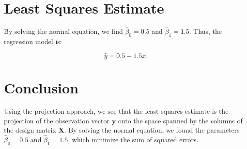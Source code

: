 \section{Least Squares Estimate}

By solving the normal equation, we find $\hat{\beta}_0 = 0.5$ and $\hat{\beta}_1 = 1.5$. Thus, the regression model is:

\begin{equation}
    \hat{y} = 0.5 + 1.5x.
\end{equation}

\section{Conclusion}

Using the projection approach, we see that the least squares estimate is the projection of the observation vector $\mathbf{y}$ onto the space spanned by the columns of the design matrix $\mathbf{X}$. By solving the normal equation, we found the parameters $\hat{\beta}_0 = 0.5$ and $\hat{\beta}_1 = 1.5$, which minimize the sum of squared errors.
